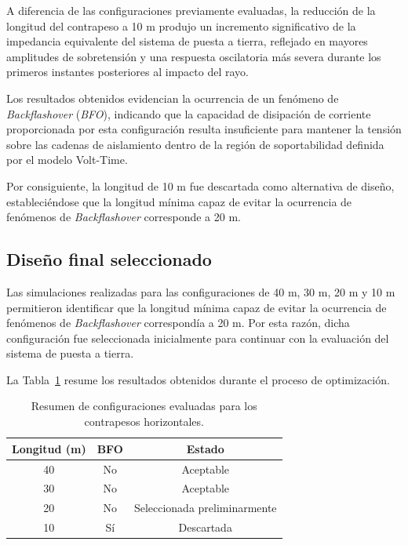 \documentclass[12pt,letterpaper]{article}
\begin{document}
A diferencia de las configuraciones previamente evaluadas, la reducción de la longitud del contrapeso a 10 m produjo un incremento significativo de la impedancia equivalente del sistema de puesta a tierra, reflejado en mayores amplitudes de sobretensión y una respuesta oscilatoria más severa durante los primeros instantes posteriores al impacto del rayo.

Los resultados obtenidos evidencian la ocurrencia de un fenómeno de \textit{Backflashover} (\textit{BFO}), indicando que la capacidad de disipación de corriente proporcionada por esta configuración resulta insuficiente para mantener la tensión sobre las cadenas de aislamiento dentro de la región de soportabilidad definida por el modelo Volt-Time.

Por consiguiente, la longitud de 10 m fue descartada como alternativa de diseño, estableciéndose que la longitud mínima capaz de evitar la ocurrencia de fenómenos de \textit{Backflashover} corresponde a 20 m.


\subsection{Diseño final seleccionado}

Las simulaciones realizadas para las configuraciones de 40 m, 30 m, 20 m y 10 m permitieron identificar que la longitud mínima capaz de evitar la ocurrencia de fenómenos de \textit{Backflashover} correspondía a 20 m. Por esta razón, dicha configuración fue seleccionada inicialmente para continuar con la evaluación del sistema de puesta a tierra.

La Tabla~\ref{tab:resumen_contrapesos} resume los resultados obtenidos durante el proceso de optimización.

\begin{table}[H]
\centering
\caption{Resumen de configuraciones evaluadas para los contrapesos horizontales.}
\label{tab:resumen_contrapesos}
\renewcommand{\arraystretch}{1.2}
\begin{tabular}{ccc}
\toprule
Longitud (m) & BFO & Estado \\
\midrule
40 & No & Aceptable \\
30 & No & Aceptable \\
20 & No & Seleccionada preliminarmente \\
10 & Sí & Descartada \\
\bottomrule
\end{tabular}
\end{table}
\end{document}
